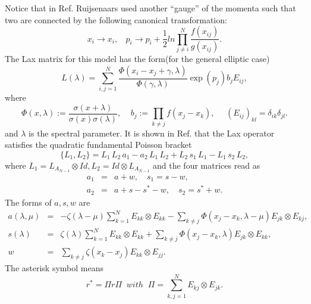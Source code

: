 \documentclass[a4paper,12pt]{article}
\begin{document}
Notice that in Ref. \cite{r1} Ruijsenaars used another
``gauge'' of the momenta such that two are connected by the
following canonical transformation:
\begin{equation}
x_{i}\longrightarrow x_{i},\ \ \ \ p_{i}\longrightarrow
p_{i}+\frac{1}{2}ln\prod_{j\neq
i}^{N}\frac{f(x_{ij})}{g(x_{ij})}.
\end{equation}
The Lax matrix for this model has the form(for the general
elliptic case)
\begin{equation}
L(\lambda )=\sum_{i,j=1}^{N}\frac{\Phi (x_{i}-x_{j}+\gamma
,\lambda )}{\Phi (\gamma ,\lambda )}\mathrm{\exp
}(p_{j})b_{j}E_{ij},  \label{laxA}
\end{equation}
where
\begin{equation}
\Phi (x,\lambda ):=\frac{\sigma (x+\lambda )}{\sigma (x)\sigma (\lambda )},
\mbox{$\ \ \ \ $}\ b_{j}:=\prod_{k\neq j}f(x_{j}-x_{k}),\ \ \ \mbox{$\ \ \ $}
(E_{ij})_{kl}=\delta _{ik}\delta _{jl}.	 \label{phi}
\end{equation}
and $\lambda$ is the spectral parameter. It is shown in Ref. \cite{s2,Avan1,kns} that the Lax operator
satisfies the quadratic fundamental Poisson bracket
\begin{equation}
\{L_{1},L_{2}\}=L_{1}\,L_{2}\,a_{1}-a_{2}\,L_{1}\,L_{2}+L_{2}\,s_{1}
\,L_{1}-L_{1}\,s_{2}\,L_{2},  \label{quad}
\end{equation}
where $L_{1}=L_{A_{N-1}}\otimes Id,L_{2}=Id\otimes
L_{A_{N-1}}$ and the four matrices read as
\begin{eqnarray}
a_{1} &=&a+w,\quad s_{1}=s-w,  \nonumber \\ a_{2}
&=&a+s-s^{\ast }-w,\quad s_{2}=s^{\ast }+w.
\end{eqnarray}
The forms of $a,s,w$ are
\begin{eqnarray}
a(\lambda ,\mu ) &=&-\zeta (\lambda -\mu
)\sum_{k=1}^{N}E_{kk}\otimes E_{kk}-\sum_{k\neq j}\Phi
(x_{j}-x_{k},\lambda -\mu )E_{jk}\otimes E_{kj},
\nonumber \\
s(\lambda ) &=&\zeta (\lambda )\sum_{k=1}^{N}E_{kk}\otimes
E_{kk}+\sum_{k\neq j}\Phi (x_{j}-x_{k},\lambda
)E_{jk}\otimes E_{kk}, \\ w &=&\sum_{k\neq j}\zeta
(x_{k}-x_{j})E_{kk}\otimes E_{jj}.  \nonumber
\end{eqnarray}
The asterisk symbol means
\begin{equation}
r^{\ast }=\Pi r\Pi \;\;\mbox{$with$}\;\;\Pi
=\sum_{k,j=1}^{N}E_{kj}\otimes E_{jk}.
\end{equation}
\end{document}
